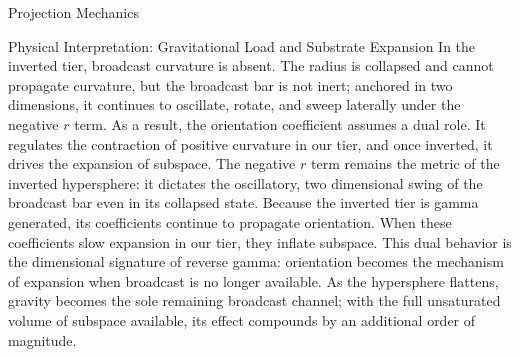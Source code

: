 \documentclass[final,onefignum,onetabnum]{siamart}
\begin{document}
\begin{section}{Projection Mechanics}
\begin{subsection}{Physical Interpretation: Gravitational Load and Substrate Expansion}
In the inverted tier, broadcast curvature is absent. The radius is collapsed and cannot propagate curvature, but the broadcast bar is not inert; anchored in two dimensions, it continues to oscillate, rotate, and sweep laterally under the negative $r$ term. As a result, the orientation coefficient assumes a dual role. It regulates the contraction of positive curvature in our tier, and once inverted, it drives the expansion of subspace. The negative $r$ term remains the metric of the inverted hypersphere: it dictates the oscillatory, two dimensional swing of the broadcast bar even in its collapsed state. Because the inverted tier is gamma generated, its coefficients continue to propagate orientation. When these coefficients slow expansion in our tier, they inflate subspace. This dual behavior is the dimensional signature of reverse gamma: orientation becomes the mechanism of expansion when broadcast is no longer available. As the hypersphere flattens, gravity becomes the sole remaining broadcast channel; with the full unsaturated volume of subspace available, its effect compounds by an additional order of magnitude.
\end{subsection}
\end{section}
\end{document}
